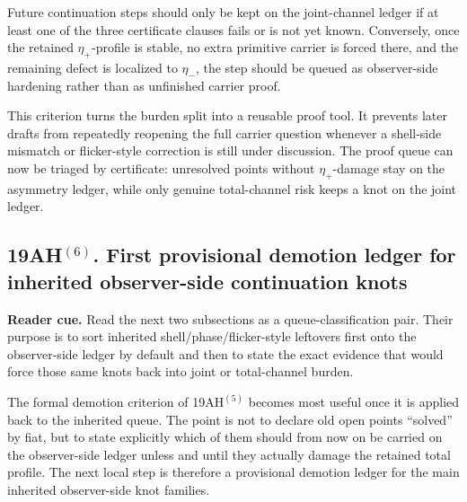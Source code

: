 \begin{corollary}
Future continuation steps should only be kept on the joint-channel ledger if at least one of the three certificate clauses fails or is not yet known. Conversely, once the retained \(\eta_+\)-profile is stable, no extra primitive carrier is forced there, and the remaining defect is localized to \(\eta_-\), the step should be queued as observer-side hardening rather than as unfinished carrier proof.
\end{corollary}

\begin{remark}
This criterion turns the burden split into a reusable proof tool. It prevents later drafts from repeatedly reopening the full carrier question whenever a shell-side mismatch or flicker-style correction is still under discussion. The proof queue can now be triaged by certificate: unresolved points without \(\eta_+\)-damage stay on the asymmetry ledger, while only genuine total-channel risk keeps a knot on the joint ledger.
\end{remark}


\subsection*{19AH$^{(6)}$. First provisional demotion ledger for inherited observer-side continuation knots}
\noindent\textbf{Reader cue.} Read the next two subsections as a queue-classification pair. Their purpose is to sort inherited shell/phase/flicker-style leftovers first onto the observer-side ledger by default and then to state the exact evidence that would force those same knots back into joint or total-channel burden.

The formal demotion criterion of 19AH$^{(5)}$ becomes most useful once it is applied back to the inherited queue. The point is not to declare old open points ``solved'' by fiat, but to state explicitly which of them should from now on be carried on the observer-side ledger unless and until they actually damage the retained total profile. The next local step is therefore a provisional demotion ledger for the main inherited observer-side knot families.

